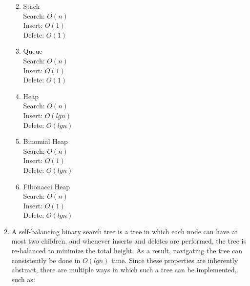 \documentclass{article}
\begin{document}
\begin{enumerate}
\begin{enumerate}[label=(\alph*)]
        \pagebreak
        \item Stack
        \\[\medskipamount]
        Search:	\(O(n)\)
        \\Insert:	\(O(1)\)
        \\Delete:	\(O(1)\)
        
        \item Queue
        \\[\medskipamount]
        Search:	\(O(n)\)
        \\Insert:	\(O(1)\)
        \\Delete:	\(O(1)\)
        
        \item Heap
        \\[\medskipamount]
        Search:	\(O(n)\)
        \\Insert:	\(O(lg n)\)
        \\Delete:	\(O(lg n)\)
        
        \item Binomial Heap
        \\[\medskipamount]
        Search:	\(O(n)\)
        \\Insert:	\(O(1)\)
        \\Delete:	\(O(lg n)\)
        
        \item Fibonacci Heap
        \\[\medskipamount]
        Search:	\(O(n)\)
        \\Insert:	\(O(1)\)
        \\Delete:	\(O(lg n)\)

    \end{enumerate}
    
\item 
    A self-balancing binary search tree is a tree in which each node can have at most two children, and whenever inserts and deletes are performed, the tree is re-balanced to minimize the total height. As a result, navigating the tree can consistently be done in \(O(lgn)\) time. Since these properties are inherently abstract, there are multiple ways in which such a tree can be implemented, such as:
    

\end{enumerate}
\end{document}

